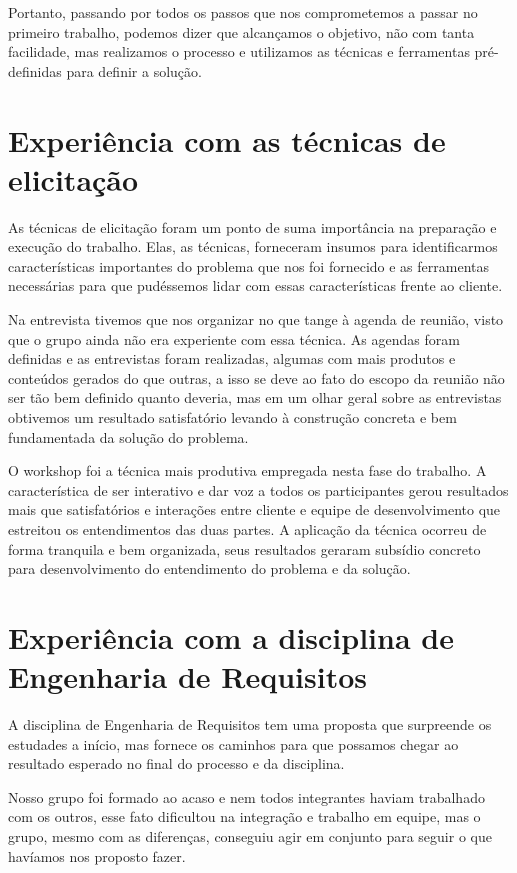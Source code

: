     Portanto, passando por todos os passos que nos comprometemos a passar no primeiro trabalho, 
  podemos dizer que alcançamos o objetivo, não com tanta facilidade, mas realizamos o processo e utilizamos as 
  técnicas e ferramentas pré-definidas para definir a solução.
  
  \section{Experiência com as técnicas de elicitação}
  
    As técnicas de elicitação foram um ponto de suma importância na preparação e execução do trabalho. 
  Elas, as técnicas, forneceram insumos para identificarmos características importantes do problema que nos 
  foi fornecido e as ferramentas necessárias para que pudéssemos lidar com essas características frente ao cliente.
    
    Na entrevista tivemos que nos organizar no que tange à agenda de reunião, visto que o grupo ainda não era 
  experiente com essa técnica. As agendas foram definidas e as entrevistas foram realizadas, algumas com mais 
  produtos e conteúdos gerados do que outras, a isso se deve ao fato do escopo da reunião não ser tão 
  bem definido quanto deveria, mas em um olhar geral sobre as entrevistas obtivemos um resultado satisfatório 
  levando à construção concreta e bem fundamentada da solução do problema.
    
    O workshop foi a técnica mais produtiva empregada nesta fase do trabalho. A característica de ser interativo 
  e dar voz a todos os participantes gerou resultados mais que satisfatórios e interações entre cliente e equipe 
  de desenvolvimento que estreitou os entendimentos das duas partes. A aplicação da técnica ocorreu de forma tranquila 
  e bem organizada, seus resultados geraram subsídio concreto para desenvolvimento do entendimento do problema e da solução. 
  
  \section{Experiência com a disciplina de Engenharia de Requisitos}
    
    A disciplina de Engenharia de Requisitos tem uma proposta que surpreende os estudades a início, 
  mas fornece os caminhos para que possamos chegar ao resultado esperado no final do processo e da disciplina.
    
    Nosso grupo foi formado ao acaso e nem todos integrantes haviam trabalhado com os outros, esse fato 
  dificultou na integração e trabalho em equipe, mas o grupo, mesmo com as diferenças, conseguiu agir em conjunto 
  para seguir o que havíamos nos proposto fazer.
    
